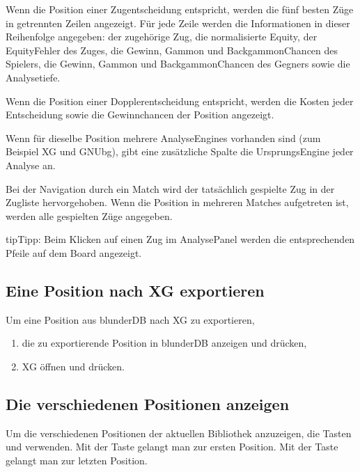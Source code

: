 \documentclass[letterpaper,10pt,german]{sphinxmanual}
\begin{document}
\sphinxAtStartPar
Wenn die Position einer Zugentscheidung entspricht, werden die fünf besten Züge in getrennten Zeilen angezeigt. Für jede Zeile werden die Informationen in dieser Reihenfolge angegeben: der zugehörige Zug, die normalisierte Equity, der Equity\sphinxhyphen{}Fehler des Zuges, die Gewinn\sphinxhyphen{}, Gammon\sphinxhyphen{} und Backgammon\sphinxhyphen{}Chancen des Spielers, die Gewinn\sphinxhyphen{}, Gammon\sphinxhyphen{} und Backgammon\sphinxhyphen{}Chancen des Gegners sowie die Analysetiefe.

\sphinxAtStartPar
Wenn die Position einer Dopplerentscheidung entspricht, werden die Kosten jeder Entscheidung sowie die Gewinnchancen der Position angezeigt.

\sphinxAtStartPar
Wenn für dieselbe Position mehrere Analyse\sphinxhyphen{}Engines vorhanden sind (zum Beispiel XG und GNUbg), gibt eine zusätzliche Spalte die Ursprungs\sphinxhyphen{}Engine jeder Analyse an.

\sphinxAtStartPar
Bei der Navigation durch ein Match wird der tatsächlich gespielte Zug in der Zugliste hervorgehoben. Wenn die Position in mehreren Matches aufgetreten ist, werden alle gespielten Züge angegeben.

\begin{sphinxadmonition}{tip}{Tipp:}
\sphinxAtStartPar
Beim Klicken auf einen Zug im Analyse\sphinxhyphen{}Panel werden die entsprechenden Pfeile auf dem Board angezeigt.
\end{sphinxadmonition}


\subsection{Eine Position nach XG exportieren}
\label{\detokenize{guide_utilisateur:exporter-une-position-vers-xg}}
\sphinxAtStartPar
Um eine Position aus blunderDB nach XG zu exportieren,
\begin{enumerate}
%
\item {} 
\sphinxAtStartPar
die zu exportierende Position in blunderDB anzeigen und  drücken,

\item {} 
\sphinxAtStartPar
XG öffnen und  drücken.

\end{enumerate}


\subsection{Die verschiedenen Positionen anzeigen}
\label{\detokenize{guide_utilisateur:visualiser-les-differentes-positions}}
\sphinxAtStartPar
Um die verschiedenen Positionen der aktuellen Bibliothek anzuzeigen, die Tasten  und  verwenden. Mit der Taste  gelangt man zur ersten Position. Mit der Taste  gelangt man zur letzten Position.
\end{document}
